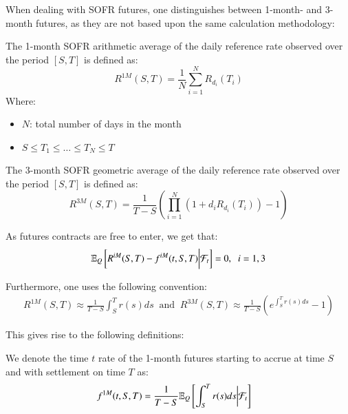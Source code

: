 \newpage 

When dealing with SOFR futures, one distinguishes between 1-month- and 3-month futures, as they are not based upon the same calculation methodology:

\begin{definition}
The 1-month 
SOFR arithmetic average of the daily reference rate observed over the period $[S,T]$ is defined as: 
\[
R^{1M}(S,T) = \frac{1}{N}\sum_{i=1}^{N}R_{d_{i}}(T_{i})
\]
Where:
\begin{itemize}[leftmargin=*]
    \item $N$: total number of days in the month
    \item $S\leq T_{1} \leq \dots \leq T_{N} \leq T$ 
\end{itemize}
\end{definition}



\begin{definition}
The 3-month 
SOFR geometric average of the daily reference rate observed over the period $[S,T]$ is defined as: 
\[
R^{3M}(S,T) = \frac{1}{T-S}\left(
\prod_{i=1}^{N}(1+d_{i}R_{d_{i}}(T_{i})) - 1
\right)
\]
\end{definition}



As futures contracts are free to enter, we get that: 
\begin{align*}
\mathbb{E}_{Q}\left[
R^{iM}(S,T) - f^{iM}(t,S,T)\bigg{|}\mathcal{F}_{t}
\right] = 0, \;\; i = 1,3   
\end{align*}

Furthermore, one uses the following convention: 
\begin{align*}
R^{1M}(S,T) \approx  \frac{1}{T-S}\int_{S}^{T}r(s)ds 
\;\;\text{and}\;\;
R^{3M}(S,T) \approx  \frac{1}{T-S}\left(e^{\int_{S}^{T}r(s)ds} -1\right) 
\end{align*}

This gives rise to the following definitions:

\begin{definition}
\label{def: 1M_SOFR_futures}
We denote the time $t$ rate of the 1-month futures starting to accrue at time $S$ and with settlement on time $T$ as:
\begin{align*}
f^{1M}(t,S,T) &= \frac{1}{T-S}\mathbb{E}_{Q}\left[
\int_{S}^{T}r(s)ds\bigg{|}\mathcal{F}_{t}
\right]    
\end{align*}
\end{definition} 


